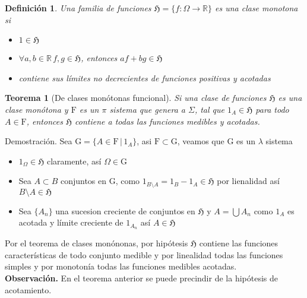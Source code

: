 \documentclass[letterpaper]{article}
\newtheorem{teorema}{Teorema}[section]
\newtheorem{def.}{Definici\'on}[section]
\newcommand{\obs}{{\newline \noindent \sc \textbf{Observación. }}}
\newcommand{\dem}{{\noindent \sc Demostraci\'on. }}
\newcommand{\re}{\ensuremath{\mathbb R }}
\begin{document}
\begin{def.}
    Una familia de funciones \(\mathfrak{H}=\{f:\Omega\rightarrow\re\}\) es una clase monotona si
\begin{itemize}
\item \(1\in\mathfrak{H}\)
\item \(\forall a,b\in\re\,f,g\in\mathfrak{H}\), entonces \(af+bg\in\mathfrak{H}\)
\item contiene sus límites no decrecientes de funciones positivas y acotadas
\end{itemize}
\end{def.}
\begin{teorema}[De clases monótonas funcional]
Si una clase de funciones $\mathfrak{H}$ es una clase monótona y $\mathrm{F}$ es un $\pi$ sistema que genera a $\Sigma$, tal que $1_A\in\mathfrak{H}$ para todo $A\in\mathrm{F}$, entonces $\mathfrak{H}$ contiene a todas las funciones medibles y acotadas.
\end{teorema}
\dem Sea \(\mathrm{G}=\{A\in\mathrm{F}\,\vert\,1_A\}\), asi \(\mathrm{F}\subset\mathrm{G}\), veamos que \(\mathrm{G}\) es un \(\lambda\) sistema
\begin{itemize}
\item \(1_{\Omega}\in\mathfrak{H}\) claramente, así \(\Omega\in\mathrm{G}\)
\item Sea \(A\subset B\) conjuntos en \(\mathrm{G}\), como \(1_{B\setminus A}=1_B-1_A\in\mathfrak{H}\) por lienalidad así \(B\setminus A\in\mathfrak{H}\)
\item Sea \(\{A_n\}\) una sucesion creciente de conjuntos en \(\mathfrak{H}\) y \(A=\bigcup A_n\) como \(1_A\) es acotada y límite creciente de \(1_{A_n}\) así \(A\in\mathfrak{H}\)
\end{itemize}
Por el teorema de clases monónonas, por hipótesis \(\mathfrak{H}\) contiene las funciones características de todo conjunto medible y por linealidad todas las funciones simples y por monotonía todas las funciones medibles acotadas.\\
\obs En el teorema anterior se puede precindir de la hipótesis de acotamiento.
\end{document}
